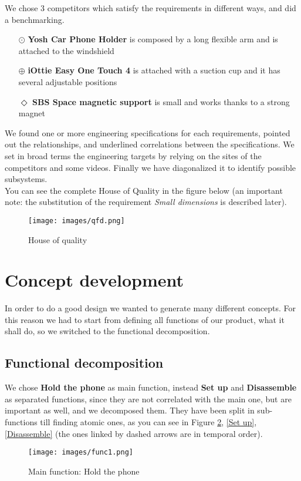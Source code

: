 \documentclass[11pt,a4paper]{article}
\begin{document}
	 We chose 3 competitors which satisfy the requirements in different ways, and did a benchmarking.
	 \begin{itemize}
	 	\item[$\odot$] \textbf{Yosh Car Phone Holder} is composed by a long flexible arm and is attached to the windshield
	 	\item[$\oplus$] \textbf{iOttie Easy One Touch 4} is attached with a suction cup and it has several adjustable positions
	 	\item[$\Diamond$] \textbf{SBS Space magnetic support} is small and works thanks to a strong magnet 
	 \end{itemize}
	 
	 We found one or more engineering specifications for each requirements, pointed out the relationships, and underlined correlations between the specifications. We set in broad terms the engineering targets by relying on the sites of the competitors and some videos.
	 Finally we have diagonalized it to identify possible subsystems.\\
	 You can see the complete House of Quality in the figure below (an important note: the substitution of the requirement \emph{Small dimensions} is described later).   
	
		\begin{figure}[H]
			\centering
			\texttt{[image: images/qfd.png]}
			\caption{House of quality}
			\label{House of quality}
		\end{figure}
\newpage
\section{Concept development}
	In order to do a good design we wanted to generate many different concepts. For this reason we had to start from defining all functions of our product, what it shall do, so we switched to the functional decomposition.
	\subsection{Functional decomposition}
		We chose \textbf{Hold the phone} as main function, instead \textbf{Set up} and \textbf{Disassemble} as separated functions, since they are not correlated with the main one, but are important as well, and we decomposed them.
		They have been split in sub-functions till finding atomic ones, as you can see in Figure \ref{Hold the phone}, \ref{Set up}, \ref{Disassemble} (the ones linked by dashed arrows are in temporal order). 
		\begin{figure}[H]
			\centering
			\texttt{[image: images/func1.png]}
			\caption{Main function: Hold the phone}
			\label{Hold the phone}
		\end{figure}
	
\end{document}
